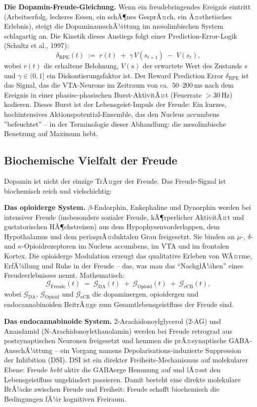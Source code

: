 ﻿\documentclass[12pt,a4paper]{report}
\theoremstyle{plain}
\theoremstyle{definition}
\theoremstyle{remark}
\begin{document}
	\textbf{Die Dopamin-Freude-Gleichung.}
	Wenn ein freudebringendes Ereignis eintritt (Arbeitserfolg,
	leckeres Essen, ein schÃ¶nes GesprÃ¤ch, ein Ã¤sthetisches Erlebnis),
	steigt die DopaminausschÃ¼ttung im mesolimbischen System
	schlagartig an. Die Kinetik dieses Anstiegs folgt einer
	Prediction-Error-Logik (Schultz et al., 1997):
	\[
	\delta_{\mathrm{RPE}}(t)
	\;:=\; r(t) \;+\; \gamma\,V(s_{t+1}) \;-\; V(s_t),
	\]
	wobei $r(t)$ die erhaltene Belohnung, $V(s)$ der erwartete Wert
	des Zustands $s$ und $\gamma \in (0,1]$ ein Diskontierungsfaktor ist.
	Der Reward Prediction Error $\delta_{\mathrm{RPE}}$ ist das Signal,
	das die VTA-Neurone im Zeitraum von ca.\ $50$--$200$\,ms nach
	dem Ereignis in einer phasisc-phasischen Burst-AktivitÃ¤t
	(Feuerrate $> 30$\,Hz) kodieren.
	Dieses Burst ist der Lebensgeist-Impuls der Freude:
	Ein kurzes, hochintensives Aktionspotential-Ensemble, das den
	Nucleus accumbens ''befeuchtet'' -- in der Terminologie dieser
	Abhandlung: die mesolimbische Benetzung auf Maximum hebt.

	\subsection{Biochemische Vielfalt der Freude}

	Dopamin ist nicht der einzige TrÃ¤ger der Freude.
	Das Freude-Signal ist biochemisch reich und vielschichtig:

	\textbf{Das opioiderge System.}
	$\beta$-Endorphin, Enkephaline und Dynor\-phin werden bei intensiver
	Freude (insbesondere sozialer Freude, kÃ¶rperlicher AktivitÃ¤t und
	gustatorischen HÃ¶chstreizen) aus dem Hypophysenvorderlappen,
	dem Hypothalamus und dem periaquÃ¤duktalen Grau freigesetzt.
	Sie binden an $\mu$-, $\delta$- und $\kappa$-Opioidrezeptoren
	im Nucleus accumbens, im VTA und im frontalen Kortex.
	Die opioiderge Modulation erzeugt das qualitative Erleben
	von WÃ¤rme, ErfÃ¼llung und Ruhe in der Freude --
	das, was man das ``NachglÃ¼hen'' eines Freudeerlebnisses nennt.
	Mathematisch:
	\[
	\mathcal{G}_{\mathrm{Freude}}(t)
	\;=\; \mathcal{G}_{\mathrm{DA}}(t)
	\;+\; \mathcal{G}_{\mathrm{Opioid}}(t)
	\;+\; \mathcal{G}_{\mathrm{eCB}}(t),
	\]
	wobei $\mathcal{G}_{\mathrm{DA}}$, $\mathcal{G}_{\mathrm{Opioid}}$
	und $\mathcal{G}_{\mathrm{eCB}}$ die dopaminergen, opioidergen
	und endocannabinoiden BeitrÃ¤ge zum Gesamtleben{s}geistfluss der
	Freude sind.

	\textbf{Das endocannabinoide System.}
	2-Arachidonoylglycerol (2-AG) und Anandamid (N-Arachidonoylethano\-lamin)
	werden bei Freude retrograd aus postsynaptischen Neuronen freigesetzt
	und hemmen die prÃ¤synaptische GABA-AusschÃ¼ttung --
	ein Vorgang namens Depolarisations-induzierte Suppression
	der Inhibition (DSI).
	DSI ist ein direkter Freiheits-Mechanismus auf molekularer Ebene:
	Freude \emph{hebt} aktiv die GABAerge Hemmung auf und lÃ¤sst den
	Lebensgeistfluss ungehindert passieren.
	Damit besteht eine direkte molekulare BrÃ¼cke zwischen Freude und Freiheit:
	Freude schafft biochemisch die Bedingungen fÃ¼r kognitiven Freiraum.
\end{document}
